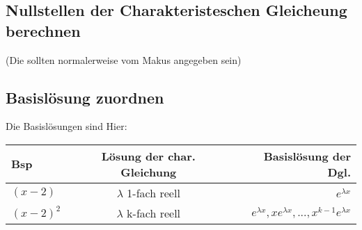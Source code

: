 \documentclass[a4paper, 11pt]{article}
\begin{document}
\subsection {Nullstellen der Charakteristeschen Gleicheung berechnen}

(Die sollten normalerweise vom Makus angegeben sein) \newline
\newline

\subsection {Basislösung zuordnen}

Die Basislösungen sind Hier:\newline
\begin{tabular} {l | c | r}
	Bsp & Lösung der char. Gleichung &  Basislösung der Dgl. \\
	\hline
	$(x-2) $ & $\lambda$ 1-fach reell & $e^{\lambda x} $ \\
	$(x-2)^2$ & $\lambda$ k-fach reell & $ e^{\lambda x }, x e^{\lambda x},..., x^{k-1} e^{\lambda x}$ \\  
\end{tabular}
\end{document}
